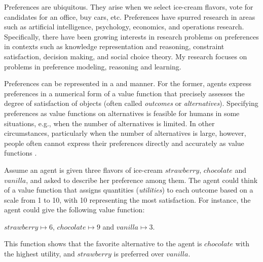 Preferences are ubiquitous.
They arise when we select ice-cream flavors, vote for candidates for an office,
buy cars, etc.
Preferences have spurred research in areas such as 
artificial intelligence, psychology, economics, and operations research.
Specifically, there have been growing interests in research problems on
preferences in contexts such as knowledge representation and reasoning, constraint 
satisfaction, decision making, and social choice theory. 
My research focuses on problems in preference modeling, 
reasoning and learning.

Preferences can be represented in a  and  manner.
For the former, agents express preferences in a numerical form of
a value function that precisely assesses the degree of satisfaction
of objects
(often called \textit{outcomes} or \textit{alternatives}).
Specifying preferences as value functions on alternatives
is feasible for humans in some situations, e.g., 
when the number of alternatives is limited.
In other circumstances, particularly when the number of alternatives is large, however,
people often cannot express their 
preferences directly and accurately as value 
functions \cite{Domshlak20111037}.

Assume an agent is given three flavors of ice-cream 
$strawberry$, $chocolate$ and $vanilla$, and asked to describe 
her preference among them.
The agent could think of a value function that
assigns quantities (\textit{utilities}) to each outcome
based on a scale from 1 to 10, with 10 representing the most satisfaction.
For instance, the agent could give the following value function:
\begin{center}
	$strawberry \mapsto 6$, $chocolate \mapsto 9$ and $vanilla \mapsto 3$.
\end{center}
This function shows that the favorite alternative to the agent is
$chocolate$ with the highest utility, and
$strawberry$ is preferred over $vanilla$.

